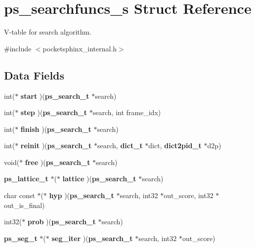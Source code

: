 \section{ps\-\_\-searchfuncs\-\_\-s Struct Reference}
\label{structps__searchfuncs__s}


V-\/table for search algorithm.  




{\ttfamily \#include $<$pocketsphinx\-\_\-internal.\-h$>$}

\subsection*{Data Fields}
\begin{DoxyCompactItemize}
\item 
int($\ast$ {\bfseries start} )({\bf ps\-\_\-search\-\_\-t} $\ast$search)\label{structps__searchfuncs__s_a74ab853abe9f12ce016c5e92e10f0fe2}

\item 
int($\ast$ {\bfseries step} )({\bf ps\-\_\-search\-\_\-t} $\ast$search, int frame\-\_\-idx)\label{structps__searchfuncs__s_a7c92cba8683e766c1d4988118fc883f7}

\item 
int($\ast$ {\bfseries finish} )({\bf ps\-\_\-search\-\_\-t} $\ast$search)\label{structps__searchfuncs__s_a20a8de3b54011ce526e1a80ad42bb7c4}

\item 
int($\ast$ {\bfseries reinit} )({\bf ps\-\_\-search\-\_\-t} $\ast$search, {\bf dict\-\_\-t} $\ast$dict, {\bf dict2pid\-\_\-t} $\ast$d2p)\label{structps__searchfuncs__s_ac72f755ca7e66ee559a117982cf1a374}

\item 
void($\ast$ {\bfseries free} )({\bf ps\-\_\-search\-\_\-t} $\ast$search)\label{structps__searchfuncs__s_ad1f76bab9eede4b2fd1dd0e65bd6c60b}

\item 
{\bf ps\-\_\-lattice\-\_\-t} $\ast$($\ast$ {\bfseries lattice} )({\bf ps\-\_\-search\-\_\-t} $\ast$search)\label{structps__searchfuncs__s_aeaeebdd2e5852aef04a25eb2291139e1}

\item 
char const $\ast$($\ast$ {\bfseries hyp} )({\bf ps\-\_\-search\-\_\-t} $\ast$search, int32 $\ast$out\-\_\-score, int32 $\ast$out\-\_\-is\-\_\-final)\label{structps__searchfuncs__s_ab35d758b994ad40cc693d1015552c3a2}

\item 
int32($\ast$ {\bfseries prob} )({\bf ps\-\_\-search\-\_\-t} $\ast$search)\label{structps__searchfuncs__s_abf94b8e4523c3f3c39fde4454f78fe16}

\item 
{\bf ps\-\_\-seg\-\_\-t} $\ast$($\ast$ {\bfseries seg\-\_\-iter} )({\bf ps\-\_\-search\-\_\-t} $\ast$search, int32 $\ast$out\-\_\-score)\label{structps__searchfuncs__s_a6b27a306eac9b96f05413aa8d6b9da61}

\end{DoxyCompactItemize}


